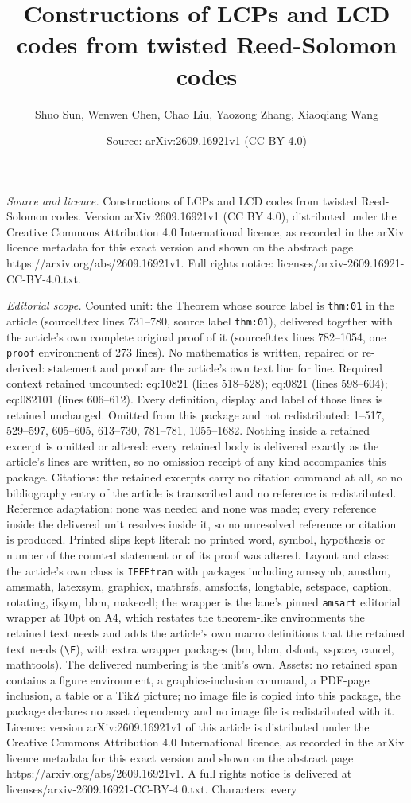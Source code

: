 \documentclass[10pt,a4paper]{amsart}
\title[Constructions of LCPs and LCD codes from twisted Reed-Solomo]{Constructions of LCPs and LCD codes from twisted Reed-Solomon codes}
\author{Shuo Sun, Wenwen Chen, Chao Liu, Yaozong Zhang, Xiaoqiang Wang}
\date{Source: arXiv:2609.16921v1 (CC BY 4.0)}
\begin{document}
\maketitle

\noindent\emph{Source and licence.} Constructions of LCPs and LCD codes from twisted Reed-Solomon codes. Version arXiv:2609.16921v1 (CC BY 4.0), distributed under the Creative Commons Attribution 4.0 International licence, as recorded in the arXiv licence metadata for this exact version and shown on the abstract page https://arxiv.org/abs/2609.16921v1. Full rights notice: licenses/arxiv-2609.16921-CC-BY-4.0.txt.\par\smallskip

\noindent\textit{Editorial scope.} Counted unit: the Theorem whose source label is \texttt{thm:01} in the article (source0.tex lines 731--780, source label \texttt{thm:01}), delivered together with the article's own complete original proof of it (source0.tex lines 782--1054, one \texttt{proof} environment of 273 lines). No mathematics is written, repaired or re-derived: statement and proof are the article's own text line for line. Required context retained uncounted: eq:10821 (lines 518--528); eq:0821 (lines 598--604); eq:082101 (lines 606--612). Every definition, display and label of those lines is retained unchanged. Omitted from this package and not redistributed: 1--517, 529--597, 605--605, 613--730, 781--781, 1055--1682. Nothing inside a retained excerpt is omitted or altered: every retained body is delivered exactly as the article's lines are written, so no omission receipt of any kind accompanies this package. Citations: the retained excerpts carry no citation command at all, so no bibliography entry of the article is transcribed and no reference is redistributed. Reference adaptation: none was needed and none was made; every reference inside the delivered unit resolves inside it, so no unresolved reference or citation is produced. Printed slips kept literal: no printed word, symbol, hypothesis or number of the counted statement or of its proof was altered. Layout and class: the article's own class is \texttt{IEEEtran} with packages including amssymb, amsthm, amsmath, latexsym, graphicx, mathrsfs, amsfonts, longtable, setspace, caption, rotating, ifsym, bbm, makecell; the wrapper is the lane's pinned \texttt{amsart} editorial wrapper at 10pt on A4, which restates the theorem-like environments the retained text needs and adds the article's own macro definitions that the retained text needs (\texttt{\textbackslash F}), with extra wrapper packages (bm, bbm, dsfont, xspace, cancel, mathtools). The delivered numbering is the unit's own. Assets: no retained span contains a figure environment, a graphics-inclusion command, a PDF-page inclusion, a table or a TikZ picture; no image file is copied into this package, the package declares no asset dependency and no image file is redistributed with it. Licence: version arXiv:2609.16921v1 of this article is distributed under the Creative Commons Attribution 4.0 International licence, as recorded in the arXiv licence metadata for this exact version and shown on the abstract page https://arxiv.org/abs/2609.16921v1. A full rights notice is delivered at licenses/arxiv-2609.16921-CC-BY-4.0.txt. Characters: every 
\end{document}
